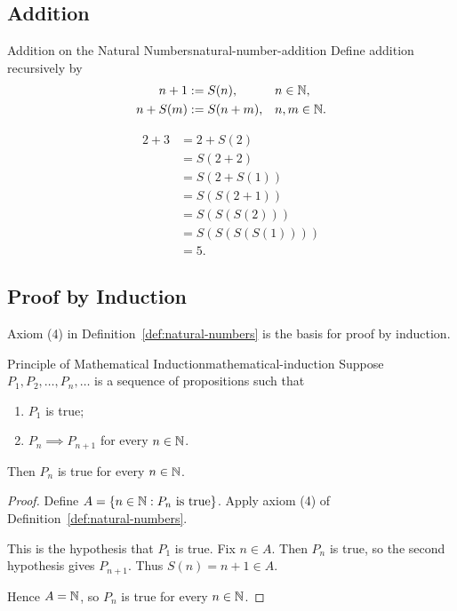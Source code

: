 \subsection{Addition}

\begin{definition}{Addition on the Natural Numbers}{natural-number-addition}
  Define addition recursively by
  \begin{align*}
    n+1    & := S(n),   &  & n\in\mathbb{N},   \\
    n+S(m) & := S(n+m), &  & n,m\in\mathbb{N}.
  \end{align*}
\end{definition}

\begin{example}
  \begin{align*}
    2+3 & = 2+S(2)        \\
        & = S(2+2)        \\
        & = S(2+S(1))     \\
        & = S(S(2+1))     \\
        & = S(S(S(2)))    \\
        & = S(S(S(S(1)))) \\
        & = 5.
  \end{align*}
\end{example}

\subsection{Proof by Induction}

Axiom (4) in Definition~\ref{def:natural-numbers} is the basis for proof by induction.

\begin{theorem}{Principle of Mathematical Induction}{mathematical-induction}
  Suppose $P_1,P_2,\ldots,P_n,\ldots$ is a sequence of propositions such that
  \begin{enumerate}
    \item $P_1$ is true;
    \item $P_n\implies P_{n+1}$ for every $n\in\mathbb{N}$.
  \end{enumerate}
  Then $P_n$ is true for every $n\in\mathbb{N}$.
\end{theorem}

\begin{proof}
  Define $A=\{n\in\mathbb{N} : P_n\text{ is true}\}$.
  Apply axiom (4) of Definition~\ref{def:natural-numbers}.
  \begin{enumerate}[proofsubgoals]
    This is the hypothesis that $P_1$ is true.
    Fix $n\in A$. Then $P_n$ is true, so the second hypothesis gives $P_{n+1}$.
    Thus $S(n)=n+1\in A$.
  \end{enumerate}
  Hence $A=\mathbb{N}$, so $P_n$ is true for every $n\in\mathbb{N}$.
\end{proof}

